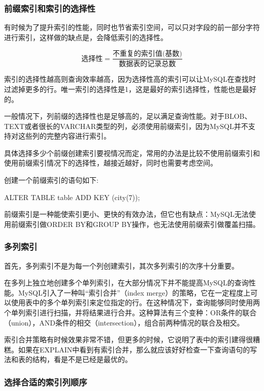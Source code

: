 \subsubsection{前缀索引和索引的选择性}

有时候为了提升索引的性能，同时也节省索引空间，可以只对字段的前一部分字符进行索引，这样做的缺点是，会降低索引的选择性。

\begin{equation}
\text{选择性} = \frac{\text{不重复的索引值(基数)}}{\text{数据表的记录总数}} \nonumber
\end{equation}

索引的选择性越高则查询效率越高，因为选择性高的索引可以让MySQL在查找时过滤掉更多的行。唯一索引的选择性是1，这是最好的索引选择性，性能也是最好的。

一般情况下，列前缀的选择性也是足够高的，足以满足查询性能。对于BLOB、TEXT或者很长的VARCHAR类型的列，必须使用前缀索引，因为MySQL并不支持对这些列的完整内容进行索引。

具体选择多少个前缀创建索引要视情况而定，常用的办法是比较不使用前缀索引和使用前缀索引情况下的选择性，越接近越好，同时也需要考虑空间。

创建一个前缀索引的语句如下:
\begin{sql}
ALTER TABLE table ADD KEY (city(7));
\end{sql}

前缀索引是一种能使索引更小、更快的有效办法，但它也有缺点：MySQL无法使用前缀索引做ORDER BY和GROUP BY操作，也无法使用前缀索引做覆盖扫描。

\subsubsection{多列索引}

首先，多列索引不是为每一个列创建索引，其次多列索引的次序十分重要。

在多列上独立地创建多个单列索引，在大部分情况下并不能提高MySQL的查询性能。MySQL引入了一种叫“索引合并”（index merge）的策略，它在一定程度上可以使用表中的多个单列索引来定位指定的行。在这种情况下，查询能够同时使用两个单列索引进行扫描，并将结果进行合并。这种算法有三个变种：OR条件的联合（union），AND条件的相交（intersection），组合前两种情况的联合及相交。

索引合并策略有时候效果非常不错，但更多的时候，它说明了表中的索引建得很糟糕。如果在EXPLAIN中看到有索引合并，那么就应该好好检查一下查询语句的写法和表的结构，看是不是已经是最优的。

\subsubsection{选择合适的索引列顺序}

